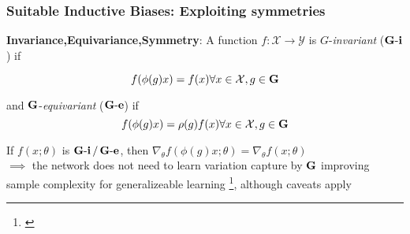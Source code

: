 \documentclass[./presentation.tex]{subfiles}
\begin{document}
\begin{frame}[label=gggback,t]
  \frametitle{Suitable Inductive Biases: Exploiting symmetries}
    \textbf{Invariance,Equivariance,Symmetry}: A function $f:\mathcal{X}\to\mathcal{Y}$ is $G$-\emph{invariant} ($\operatorname{\mathbf{G-i}}$) if 

    \begin{equation}
  f(\phi(g)x)=f(x)\forall x \in \mathcal{X},g\in \operatorname{\mathbf{G}}\nonumber
    \end{equation}

  and $\operatorname{\mathbf{G}}$-\emph{equivariant} ($\operatorname{\mathbf{G-e}}$) if
  \begin{equation}
  f(\phi(g)x)=\rho(g)f(x) \forall x \in\mathcal{X},g\in \operatorname{\mathbf{G}}\nonumber
  \end{equation}

  If $f(x;\theta)$ is $\operatorname{\mathbf{G-i}}/\operatorname{\mathbf{G-e}}$, then $\nabla_\theta f(\phi(g)x;\theta)=\nabla_\theta f(x;\theta)$\\

  $\implies$ the network does not need to learn variation capture by $\operatorname{\mathbf{G}}$ improving sample complexity for generalizeable learning
  \footnote[frame]{\cite{elesedyProvablyStrictGeneralisation2021b}}, although caveats apply
\end{frame}
\end{document}
